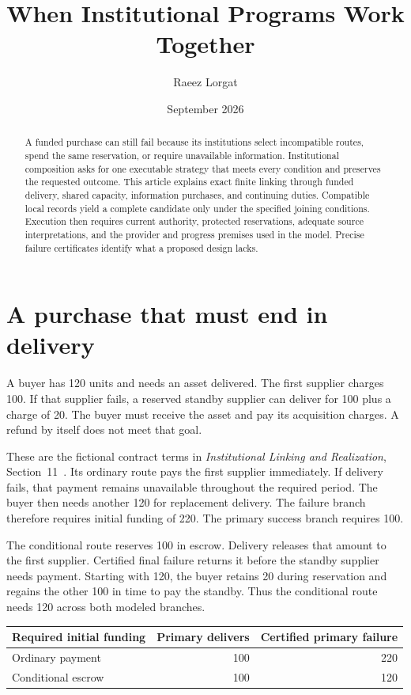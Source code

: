 \documentclass{momentum}
\title{When Institutional Programs Work Together}
\author{Raeez Lorgat}
\date{September 2026}
\begin{document}
\maketitle

\begin{abstract}
A funded purchase can still fail because its institutions select incompatible routes, spend the same reservation, or require unavailable information.
Institutional composition asks for one executable strategy that meets every condition and preserves the requested outcome.
This article explains exact finite linking through funded delivery, shared capacity, information purchases, and continuing duties.
Compatible local records yield a complete candidate only under the specified joining conditions.
Execution then requires current authority, protected reservations, adequate source interpretations, and the provider and progress premises used in the model.
Precise failure certificates identify what a proposed design lacks.
\end{abstract}

\section{A purchase that must end in delivery}
\label{sec:purchase}

A buyer has 120 units and needs an asset delivered.
The first supplier charges 100.
If that supplier fails, a reserved standby supplier can deliver for 100 plus a charge of 20.
The buyer must receive the asset and pay its acquisition charges.
A refund by itself does not meet that goal.

These are the fictional contract terms in \emph{Institutional Linking and Realization}, Section~11~\cite{linking}.
Its ordinary route pays the first supplier immediately.
If delivery fails, that payment remains unavailable throughout the required period.
The buyer then needs another 120 for replacement delivery.
The failure branch therefore requires initial funding of 220.
The primary success branch requires 100.

The conditional route reserves 100 in escrow.
Delivery releases that amount to the first supplier.
Certified final failure returns it before the standby supplier needs payment.
Starting with 120, the buyer retains 20 during reservation and regains the other 100 in time to pay the standby.
Thus the conditional route needs 120 across both modeled branches.

\begin{center}
\begin{tabular}{lrr}
\toprule
Required initial funding & Primary delivers & Certified primary failure\\
\midrule
Ordinary payment & 100 & 220\\
Conditional escrow & 100 & 120\\
\bottomrule
\end{tabular}
\end{center}
\end{document}
